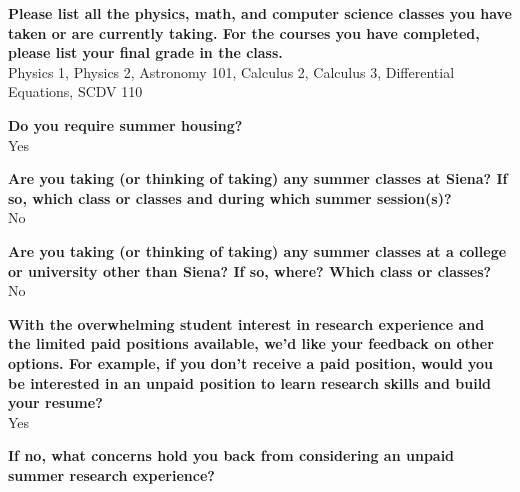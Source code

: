\documentclass[12pt,preprint]{aastex}
\begin{document}
 \vspace*{1mm}
{\bf Please list all the physics, math, and computer science classes you have taken or are currently taking.  For the courses you have completed, please list your final grade in the class.}\\
Physics 1, Physics 2, Astronomy 101, Calculus 2, Calculus 3, Differential Equations, SCDV 110 

\vspace*{3mm}
{\bf Do you require summer housing?}\\
Yes

\vspace*{3mm}
{\bf Are you taking (or thinking of taking) any summer classes at Siena?  If so, which class or classes and during which summer session(s)?}\\
No

\vspace*{3mm}
{\bf Are you taking (or thinking of taking) any summer classes at a college or university other than Siena?  If so, where?  Which class or classes?}\\
No

\vspace*{3mm}
{\bf With the overwhelming student interest in research experience and the limited paid positions available, we'd like your feedback on other options.  For example, if you don't receive a paid position, would you be interested in an unpaid position to learn research skills and build your resume?}\\
Yes

\vspace*{3mm}
{\bf If no, what concerns hold you back from considering an unpaid summer research experience?}\\
\vspace*{3mm}
\end{document}
